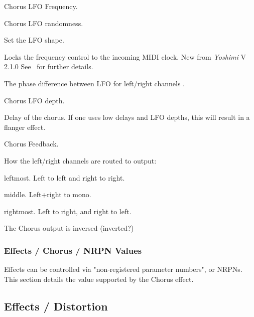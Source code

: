    \setcounter{ItemCounter}{0}      %

   Chorus LFO Frequency.

   Chorus LFO randomness.

   Set the LFO shape.

   Locks the frequency control to the incoming MIDI clock. New from
   \textsl{Yoshimi} V 2.1.0 See
   \ for further details.

   The phase difference between LFO for left/right channels .

   Chorus LFO depth.

   Delay of the chorus.
   If one uses low delays and LFO depths, this will result in a flanger
   effect.

   Chorus Feedback.

   How the left/right channels are routed to output:

      \begin{enumber}
         \item leftmost. Left to left and right to right.
         \item middle. Left+right to mono.
         \item rightmost. Left to right, and right to left.
      \end{enumber}

   The Chorus output is inversed (inverted?)

\subsubsection{Effects / Chorus / NRPN Values}
\label{subsubsec:effects_edit_chorus_nrpn}

Effects can be controlled via "non-registered parameter numbers", or NRPNs.
This section details the value supported by the Chorus effect.

\subsection{Effects / Distortion}
\label{subsec:effects_edit_distortion}


